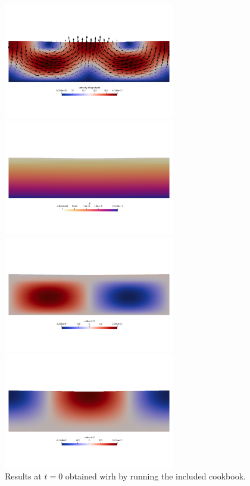 \begin{center}
\includegraphics[width=7.5cm]{images/benchmark_crsg12/aspect/vel}
\includegraphics[width=7.5cm]{images/benchmark_crsg12/aspect/press}\\
\includegraphics[width=7.5cm]{images/benchmark_crsg12/aspect/u}
\includegraphics[width=7.5cm]{images/benchmark_crsg12/aspect/v}\\
{\captionfont Results at $t=0$ obtained wirh \aspect{} by running the included cookbook.}
\end{center}


